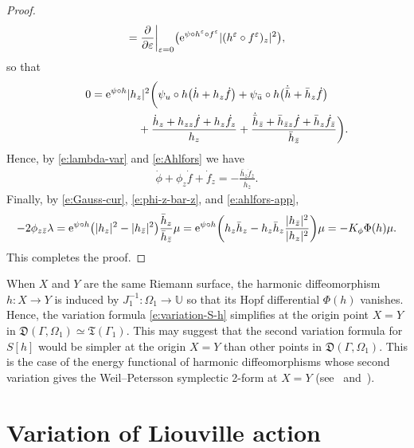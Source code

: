 \documentclass[10pt,a4paper]{amsart}
\numberwithin{equation}{section}
\newcommand{\vep}{\varepsilon}
\begin{document}
\begin{proof}
\begin{gather*}
=\frac{\partial}{\partial\vep}\bigg|_{\vep=0} \big({\rm e}^{\psi\circ h^\vep \circ f^\vep} |(h^\vep \circ f^\vep)_z|^2 \big),
\end{gather*}
so that
\begin{gather}
0= {\rm e}^{\psi\circ h} |h_z|^2\bigg(\psi_u\circ h \big(\dot{h}+h_z \dot{f} \big) +\psi_{\bar{u}} \circ h \big( \dot{\bar{h}}+ \bar{h}_z \dot{f} \big)\nonumber
\\ \hphantom{0= {\rm e}^{\psi\circ h} |h_z|^2\bigg(}
{} + \frac{\dot{h}_z+h_{zz}\dot{f} +h_z \dot{f}_z}{ h_z}+ \frac{\dot{\bar{h}}_{\bar{z}}+\bar{h}_{\bar{z}z}\dot{f}+\bar{h}_{z}\dot{f}_{\bar{z}} }{ \bar{h}_{\bar{z}}} \bigg).\label{e:Ahlfors}
\end{gather}
Hence, by \eqref{e:lambda-var} and \eqref{e:Ahlfors} we have
\begin{gather}\label{e:ahlfors-app}
\dot{\phi}+\phi_z\dot{f}+\dot{f}_z = -\frac{\bar{h}_{z}\dot{f}_{\bar{z}} }{ \bar{h}_{\bar{z}}}.
\end{gather}
Finally, by \eqref{e:Gauss-cur}, \eqref{e:phi-z-bar-z}, and \eqref{e:ahlfors-app},
\begin{gather*}
- 2\phi_{z\bar{z}} \lambda= {\rm e}^{\psi\circ h} \big(|h_{{z}}|^2- |h_{\bar{z}}|^2\big) \frac{\bar{h}_{z} }{ \bar{h}_{\bar{z}}} \mu
= {\rm e}^{\psi\circ h} \bigg( h_{{z}} \bar{h}_{z}- h_{{z}} \bar{h}_{z} \frac{|h_{\bar{z}}|^2}{{|h_{z}|^2}} \bigg) \mu = -K_{\phi} \Phi(h) \mu.
\end{gather*}
This completes the proof.
\end{proof}


\begin{Remark}%
When $X$ and $Y$ are the same Riemann surface, the harmonic diffeomorphism $h\colon X\to Y$ is induced by $J_1^{-1}\colon \Omega_1\to \mathbb{U}$ so that its Hopf differential $\Phi(h)$ vanishes. Hence, the variation formula \eqref{e:variation-S-h} simplifies at the origin point $X=Y$ in $\mathfrak{D}(\Gamma,\Omega_1) \simeq \mathfrak{T}(\Gamma_1)$.
This may suggest that the second variation formula for $S[h]$ would be simpler at the origin $X=Y$ than other points in $\mathfrak{D}(\Gamma,\Omega_1)$. This is the case of
the energy functional of harmonic diffeomorphisms whose second variation gives the Weil--Petersson symplectic 2-form at $X=Y$ (see~\cite[Corollary~5.8]{W89} and~\cite[Theorem~3.1.3]{Tromba}).
\end{Remark}

\section{Variation of Liouville action}\label{s:variation}
\end{document}
